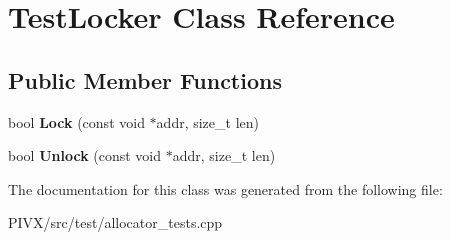 \hypertarget{class_test_locker}{}\section{Test\+Locker Class Reference}
\label{class_test_locker}
\subsection*{Public Member Functions}
\begin{DoxyCompactItemize}
\item 
\mbox{\label{class_test_locker_a3fe641f059dbad71492bf67803c48942}} 
bool {\bfseries Lock} (const void $\ast$addr, size\+\_\+t len)
\item 
\mbox{\label{class_test_locker_a2dd93706bf6e42cdda57bbab0a88893b}} 
bool {\bfseries Unlock} (const void $\ast$addr, size\+\_\+t len)
\end{DoxyCompactItemize}


The documentation for this class was generated from the following file\+:\begin{DoxyCompactItemize}
\item 
P\+I\+V\+X/src/test/allocator\+\_\+tests.\+cpp\end{DoxyCompactItemize}
